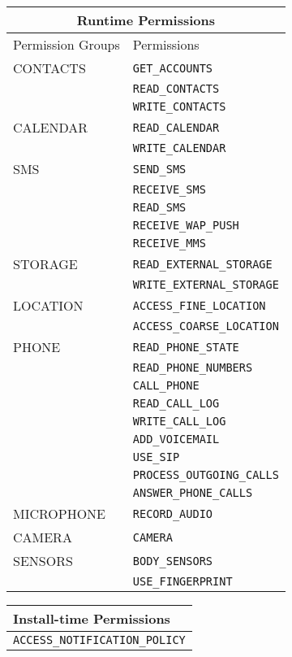 \documentclass[
  a4paper,  %
  twoside,  %
  bibliography=totoc,
  headsepline,
  cleardoublepage=empty,
  parskip=half,
  draft=false,
  open=any
]{scrbook}
\begin{document}
\begin{table}
\centering
\begin{tabular}{ |p{2.4cm}||p{4cm}|  }
\hline
\multicolumn{2}{|c|}{Runtime Permissions} \\
\hline
Permission Groups & Permissions\\
\hline\hline
CONTACTS & \texttt{GET\_ACCOUNTS} \\
& \texttt{READ\_CONTACTS} \\
& \texttt{WRITE\_CONTACTS} \\
\hline
CALENDAR & \texttt{READ\_CALENDAR} \\
& \texttt{WRITE\_CALENDAR} \\
\hline
SMS & \texttt{SEND\_SMS} \\
& \texttt{RECEIVE\_SMS} \\
& \texttt{READ\_SMS} \\
& \texttt{RECEIVE\_WAP\_PUSH} \\
& \texttt{RECEIVE\_MMS} \\
\hline
STORAGE & \texttt{READ\_EXTERNAL\_STORAGE} \\
& \texttt{WRITE\_EXTERNAL\_STORAGE} \\
\hline
LOCATION & \texttt{ACCESS\_FINE\_LOCATION} \\
& \texttt{ACCESS\_COARSE\_LOCATION} \\
\hline
PHONE & \texttt{READ\_PHONE\_STATE} \\
& \texttt{READ\_PHONE\_NUMBERS} \\
& \texttt{CALL\_PHONE} \\
& \texttt{READ\_CALL\_LOG} \\
& \texttt{WRITE\_CALL\_LOG} \\
& \texttt{ADD\_VOICEMAIL} \\
& \texttt{USE\_SIP} \\
& \texttt{PROCESS\_OUTGOING\_CALLS} \\
& \texttt{ANSWER\_PHONE\_CALLS} \\
\hline
MICROPHONE & \texttt{RECORD\_AUDIO} \\
\hline
CAMERA & \texttt{CAMERA} \\
\hline
SENSORS & \texttt{BODY\_SENSORS} \\
& \texttt{USE\_FINGERPRINT} \\
\hline
\end{tabular}
\begin{tabular}{|p{6.5cm}|}
\hline
{Install-time Permissions} \\
\hline\hline
\texttt{ACCESS\_NOTIFICATION\_POLICY} \\

\end{tabular}
\end{table}
\end{document}
